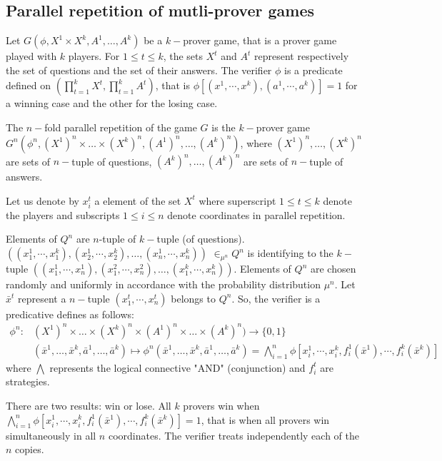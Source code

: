 \subsection{Parallel repetition of mutli-prover games}

Let $G(\phi, X^1 \times X^k, A^1, \ldots, A^k)$ be a $k-$prover game, that is a prover game played with $k$ players. For $1 \leq t \leq k$, the sets $X^t$ and $A^t$ represent respectively the set of questions and the set of their answers. The verifier $\phi$ is a predicate  defined on $\left( \prod\limits_{t=1}^k X^t, \prod\limits_{t=1}^k A^t \right)$, that is $\phi [(x^1, \cdots , x^k),(a^1, \cdots , a^k)]=1$ for a winning case and  the other for the losing case. 

The $n-$fold parallel repetition of the game $G$ is the $k-$prover game $G^n(\phi^n, (X^1)^n \times \ldots \times (X^k)^n, (A^1)^n, \ldots,( A^k)^n)$, where  $(X^1)^n , \ldots, (X^k)^n$ are sets of $n-$tuple of questions, $(A^k)^n , \ldots, (A^k)^n$ are sets of $n-$tuple of answers. 

Let us denote by $x_i^t$ a element of the set $X^t$ where superscript $1\leq t \leq k$   denote the players and subscripts $1 \leq i \leq n$  denote  coordinates in parallel repetition.

Elements of $Q^n$ are $n$-tuple of $k-$tuple (of questions). $((x_1^1, \cdots , x_1^k), (x_2^1, \cdots , x_2^k),\ldots, (x_n^1, \cdots , x_n^k))$ $ \in_{\mu^n} Q^n$ is identifying to the $k-$tuple $((x_1^1, \cdots , x_n^1), (x_1^2, \cdots , x_n^2),\ldots, (x_1^k, \cdots , x_n^k))$. Elements of $Q^n$ are chosen randomly and uniformly in accordance with the probability distribution $\mu^n$. Let $\bar{x}^t$ represent a $n-$tuple $(x_1^t, \cdots , x_n^t)$ belongs to $Q^n$. So, the verifier is a predicative defines as follows:
\begin{align*}
\phi^n: &(X^1)^n \times \ldots \times (X^k)^n \times (A^1)^n \times \ldots \times ( A^k)^n)  \longrightarrow  \{0,1\}\\ 
& (\bar{x}^1,\ldots, \bar{x}^k,\bar{a}^1, \ldots, \bar{a}^k)  \longmapsto  \phi^n (\bar{x}^1,\ldots, \bar{x}^k,\bar{a}^1, \ldots, \bar{a}^k) = \bigwedge\limits_{i=1}^n \phi [x_i^1, \cdots , x_i^k, f_i^1(\bar{x}^1), \cdots ,  f_i^k(\bar{x}^k)]
\end{align*}
where $\bigwedge$ represents the logical connective "AND" (conjunction) and $f_i^t$ are strategies.

There are two results: win or lose. All $k$ provers win when $ \bigwedge\limits_{i=1}^n \phi [x_i^1, \cdots , x_i^k, f_i^1(\bar{x}^1), \cdots ,  f_i^k(\bar{x}^k)]=1$, that is when all provers win simultaneously in all $n$ coordinates. The verifier treats independently each of the $n$ copies. 

